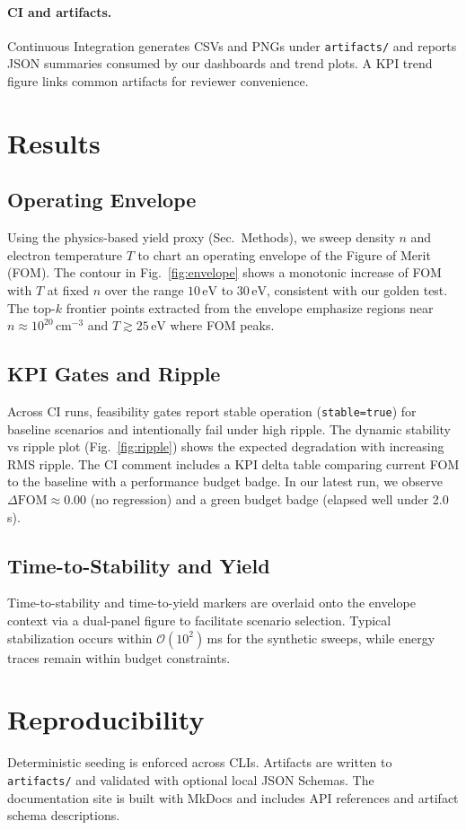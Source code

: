 \documentclass[11pt]{article}
\begin{document}
\paragraph{CI and artifacts.} Continuous Integration generates CSVs and PNGs under \texttt{artifacts/} and reports JSON summaries consumed by our dashboards and trend plots. A KPI trend figure links common artifacts for reviewer convenience.

\section{Results}
\subsection{Operating Envelope}
Using the physics-based yield proxy (Sec.~Methods), we sweep density $n$ and electron temperature $T$ to chart an operating envelope of the Figure of Merit (FOM). The contour in Fig.~\ref{fig:envelope} shows a monotonic increase of FOM with $T$ at fixed $n$ over the range $10\,\mathrm{eV}$ to $30\,\mathrm{eV}$, consistent with our golden test. The top-$k$ frontier points extracted from the envelope emphasize regions near $n\approx 10^{20}\,\mathrm{cm}^{-3}$ and $T\gtrsim 25\,\mathrm{eV}$ where FOM peaks.

\subsection{KPI Gates and Ripple}
Across CI runs, feasibility gates report stable operation (\texttt{stable=true}) for baseline scenarios and intentionally fail under high ripple. The dynamic stability vs ripple plot (Fig.~\ref{fig:ripple}) shows the expected degradation with increasing RMS ripple. The CI comment includes a KPI delta table comparing current FOM to the baseline with a performance budget badge. In our latest run, we observe $\Delta\mathrm{FOM}\approx 0.00$ (no regression) and a green budget badge (elapsed well under 2.0\,s).

\subsection{Time-to-Stability and Yield}
Time-to-stability and time-to-yield markers are overlaid onto the envelope context via a dual-panel figure to facilitate scenario selection. Typical stabilization occurs within $\mathcal{O}(10^2)$\,ms for the synthetic sweeps, while energy traces remain within budget constraints.
\section{Reproducibility}
Deterministic seeding is enforced across CLIs. Artifacts are written to \texttt{artifacts/} and validated with optional local JSON Schemas. The documentation site is built with MkDocs and includes API references and artifact schema descriptions.
\end{document}
